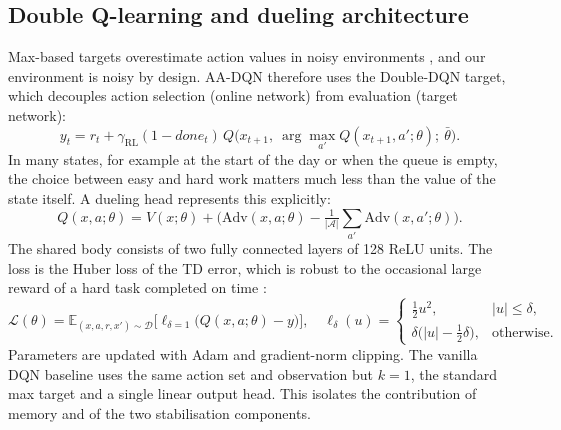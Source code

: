\subsection{Double Q-learning and dueling architecture}\label{sec:dueling}
Max-based targets overestimate action values in noisy environments \cite{vanhasselt2016}, and our environment is noisy by design. AA-DQN therefore uses the Double-DQN target, which decouples action selection (online network) from evaluation (target network):
\begin{equation}
y_t=r_t+\gamma_{\mathrm{RL}}(1-\textit{done}_t)\,Q\big(x_{t+1},\ \arg\max_{a'}Q(x_{t+1},a';\theta);\ \bar\theta\big).
\label{eq:target}
\end{equation}
In many states, for example at the start of the day or when the queue is empty, the choice between easy and hard work matters much less than the value of the state itself. A dueling head \cite{wang2016dueling} represents this explicitly:
\begin{equation}
Q(x,a;\theta)=V(x;\theta)+\Big(\mathrm{Adv}(x,a;\theta)-\tfrac1{|\mathcal A|}\textstyle\sum_{a'}\mathrm{Adv}(x,a';\theta)\Big).
\end{equation}
The shared body consists of two fully connected layers of 128 ReLU units. The loss is the Huber loss of the TD error, which is robust to the occasional large reward of a hard task completed on time \cite{huber1964}:
\begin{equation}
\mathcal L(\theta)=\mathbb E_{(x,a,r,x')\sim\mathcal D}\big[\ell_{\delta=1}\big(Q(x,a;\theta)-y\big)\big],\quad
\ell_{\delta}(u)=\begin{cases}\tfrac12u^2, & |u|\le\delta,\\ \delta\big(|u|-\tfrac12\delta\big), & \text{otherwise.}\end{cases}
\label{eq:huber}
\end{equation}
Parameters are updated with Adam \cite{kingma2015} and gradient-norm clipping. The vanilla DQN baseline uses the same action set and observation but $k=1$, the standard max target and a single linear output head. This isolates the contribution of memory and of the two stabilisation components.

